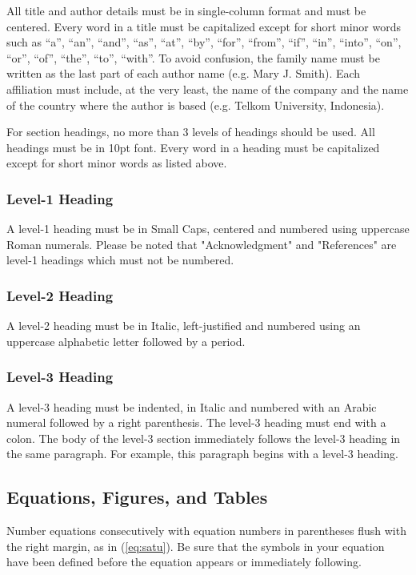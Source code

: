 \documentclass[]{indojc}
\begin{document}
All title and author details must be in single-column format and must be centered. Every word in a title must be capitalized except for short minor
words such as ``a'', ``an'', ``and'', ``as'', ``at'', ``by'', ``for'', ``from'',
``if'', ``in'', ``into'', ``on'', ``or'', ``of'', ``the'', ``to'', ``with''.  To avoid confusion, the family name must be written as the last part of each author name (e.g. Mary J. Smith). Each affiliation must include, at the very least, the name of the company and the name of the country where the author is based (e.g. Telkom University, Indonesia).  

For section headings, no more than 3 levels of headings should be used. All headings must be in 10pt font. Every word in a heading must be capitalized except for short minor words as listed above.

\subsubsection{Level-1 Heading}
A level-1 heading must be in Small Caps, centered and numbered using uppercase Roman numerals. Please be noted that "Acknowledgment" and "References" are level-1 headings which must not be numbered.

\subsubsection{Level-2 Heading}
A level-2 heading must be in Italic, left-justified and numbered using an uppercase alphabetic letter followed by a period. 

\subsubsection{Level-3 Heading} 
A level-3 heading must be indented, in Italic and numbered with an Arabic numeral followed by a right parenthesis. The level-3 heading must end with a colon. The body of the level-3 section immediately follows the level-3 heading in the same paragraph. For example, this paragraph begins with a level-3 heading.

\subsection{Equations, Figures, and Tables}
Number equations consecutively with equation numbers in parentheses flush with the right margin, as in (\ref{eq:satu}). Be sure that the symbols in your equation have been defined before the equation appears or immediately following. 
\end{document}
